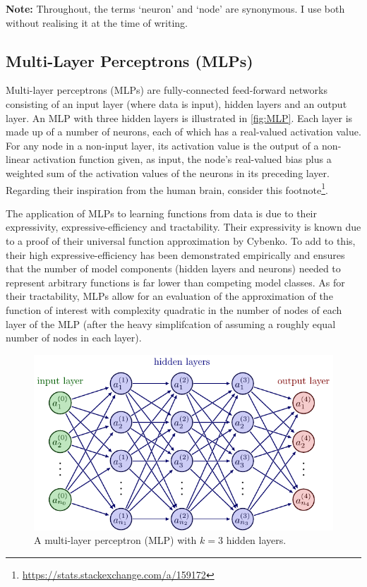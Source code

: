 \documentclass[11pt]{article}
\begin{document}
\noindent\textbf{Note:} Throughout, the terms `neuron' and `node' are synonymous. I use both without realising it at the time of writing.

\subsection{Multi-Layer Perceptrons (MLPs)}

Multi-layer perceptrons (MLPs) are fully-connected feed-forward networks consisting of an input layer (where data is input), hidden layers and an output layer. An MLP with three hidden layers is illustrated in \autoref{fig:MLP}. Each layer is made up of a number of neurons, each of which has a real-valued activation value.  For any node in a non-input layer, its activation value is the output of a non-linear activation function given, as input, the node's real-valued bias plus a weighted sum of the activation values of the neurons in its preceding layer. Regarding their inspiration from the human brain, consider this footnote\footnote{\url{https://stats.stackexchange.com/a/159172}}.

The application of MLPs to learning functions from data is due to their expressivity, expressive-efficiency and tractability. Their expressivity is known due to a proof of their universal function approximation by Cybenko. To add to this, their high expressive-efficiency has been demonstrated empirically and ensures that the number of model components (hidden layers and neurons) needed to represent arbitrary functions is far lower than competing model classes. As for their tractability, MLPs allow for an evaluation of the approximation of the function of interest with complexity quadratic in the number of nodes of each layer of the MLP (after the heavy simplifcation of assuming a roughly equal number of nodes in each layer).

\begin{figure}[ht]
    \centering
    \includegraphics[width=1\linewidth]{./figures/neural_nets/MLP_1.pdf}
    \caption{A multi-layer perceptron (MLP) with $k=3$ hidden layers.}
    \label{fig:MLP}
\end{figure}
\end{document}
